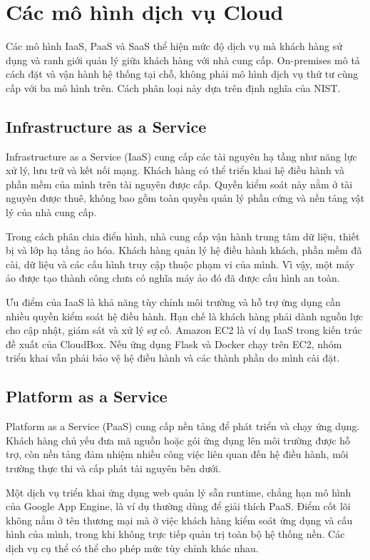 \section{Các mô hình dịch vụ Cloud}
Các mô hình IaaS, PaaS và SaaS thể hiện mức độ dịch vụ mà khách hàng sử dụng và ranh giới quản lý giữa khách hàng với nhà cung cấp. On-premises mô tả cách đặt và vận hành hệ thống tại chỗ, không phải mô hình dịch vụ thứ tư cùng cấp với ba mô hình trên. Cách phân loại này dựa trên định nghĩa của NIST.\cite{nistcloud}

\subsection{Infrastructure as a Service}
Infrastructure as a Service (IaaS) cung cấp các tài nguyên hạ tầng như năng lực xử lý, lưu trữ và kết nối mạng. Khách hàng có thể triển khai hệ điều hành và phần mềm của mình trên tài nguyên được cấp. Quyền kiểm soát này nằm ở tài nguyên được thuê, không bao gồm toàn quyền quản lý phần cứng và nền tảng vật lý của nhà cung cấp.

Trong cách phân chia điển hình, nhà cung cấp vận hành trung tâm dữ liệu, thiết bị và lớp hạ tầng ảo hóa. Khách hàng quản lý hệ điều hành khách, phần mềm đã cài, dữ liệu và các cấu hình truy cập thuộc phạm vi của mình. Vì vậy, một máy ảo được tạo thành công chưa có nghĩa máy ảo đó đã được cấu hình an toàn.

Ưu điểm của IaaS là khả năng tùy chỉnh môi trường và hỗ trợ ứng dụng cần nhiều quyền kiểm soát hệ điều hành. Hạn chế là khách hàng phải dành nguồn lực cho cập nhật, giám sát và xử lý sự cố. Amazon EC2 là ví dụ IaaS trong kiến trúc đề xuất của CloudBox. Nếu ứng dụng Flask và Docker chạy trên EC2, nhóm triển khai vẫn phải bảo vệ hệ điều hành và các thành phần do mình cài đặt.\cite{shared}

\subsection{Platform as a Service}
Platform as a Service (PaaS) cung cấp nền tảng để phát triển và chạy ứng dụng. Khách hàng chủ yếu đưa mã nguồn hoặc gói ứng dụng lên môi trường được hỗ trợ, còn nền tảng đảm nhiệm nhiều công việc liên quan đến hệ điều hành, môi trường thực thi và cấp phát tài nguyên bên dưới.

Một dịch vụ triển khai ứng dụng web quản lý sẵn runtime, chẳng hạn mô hình của Google App Engine, là ví dụ thường dùng để giải thích PaaS. Điểm cốt lõi không nằm ở tên thương mại mà ở việc khách hàng kiểm soát ứng dụng và cấu hình của mình, trong khi không trực tiếp quản trị toàn bộ hệ thống nền. Các dịch vụ cụ thể có thể cho phép mức tùy chỉnh khác nhau.

